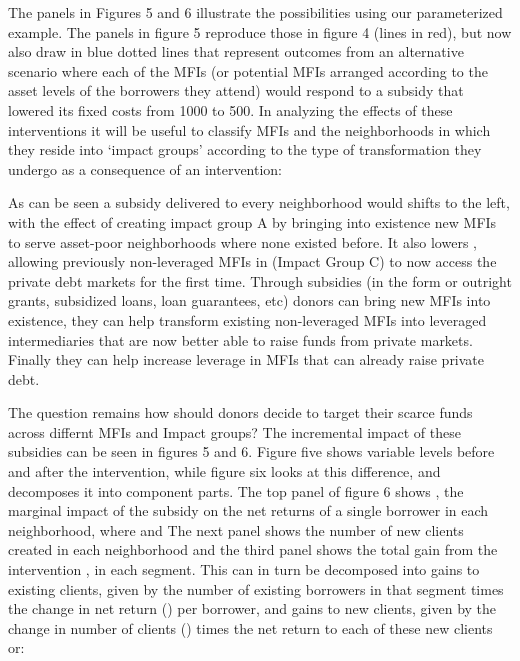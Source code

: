 \documentclass{article}
\begin{document}
The panels in Figures 5 and 6 illustrate the possibilities using our
parameterized example. The panels in figure 5 reproduce those in figure
4 (lines in red), but now also draw in blue dotted lines that represent
outcomes from an alternative scenario where each of the MFIs (or
potential MFIs arranged according to the asset levels of the borrowers
they attend) would respond to a subsidy that lowered its fixed costs
from 1000 to 500. In analyzing the effects of these interventions it
will be useful to classify MFIs and the neighborhoods in which they
reside into `impact groups' according to the type of transformation they
undergo as a consequence of an intervention:

As can be seen a subsidy delivered to every neighborhood would shifts to
the left, with the effect of creating impact group A by bringing into
existence new MFIs to serve asset-poor neighborhoods where none existed
before. It also lowers , allowing previously non-leveraged MFIs in
(Impact Group C) to now access the private debt markets for the first
time. Through subsidies (in the form or outright grants, subsidized
loans, loan guarantees, etc) donors can bring new MFIs into existence,
they can help transform existing non-leveraged MFIs into leveraged
intermediaries that are now better able to raise funds from private
markets. Finally they can help increase leverage in MFIs that can
already raise private debt.

The question remains how should donors decide to target their scarce
funds across differnt MFIs and Impact groups? The incremental impact of
these subsidies can be seen in figures 5 and 6. Figure five shows
variable levels before and after the intervention, while figure six
looks at this difference, and decomposes it into component parts. The
top panel of figure 6 shows , the marginal impact of the subsidy on the
net returns of a single borrower in each neighborhood, where and The
next panel shows the number of new clients created in each neighborhood
and the third panel shows the total gain from the intervention , in each
segment. This can in turn be decomposed into gains to existing clients,
given by the number of existing borrowers in that segment times the
change in net return () per borrower, and gains to new clients, given by
the change in number of clients () times the net return to each of these
new clients or:
\end{document}
